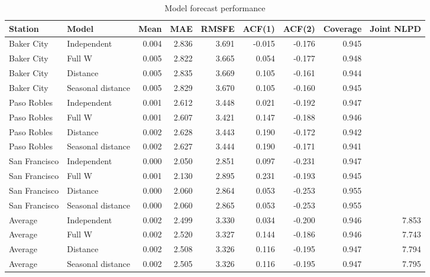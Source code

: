 \documentclass[
  10pt,
]{article}
\begin{document}
\begin{table}

\caption{\label{tab:tbl_perf_indiv}Model forecast performance\label{tbl:perf_indiv}}
\centering
\begin{tabular}[t]{llrrrrrrr}
\toprule
Station & Model & Mean & MAE & RMSFE & ACF(1) & ACF(2) & Coverage & Joint NLPD\\
\midrule
Baker City & Independent & 0.004 & 2.836 & 3.691 & -0.015 & -0.176 & 0.945 & \\
Baker City & Full W & 0.005 & 2.822 & 3.665 & 0.054 & -0.177 & 0.948 & \\
Baker City & Distance & 0.005 & 2.835 & 3.669 & 0.105 & -0.161 & 0.944 & \\
Baker City & Seasonal distance & 0.005 & 2.829 & 3.670 & 0.105 & -0.160 & 0.945 & \\
\addlinespace
Paso Robles & Independent & 0.001 & 2.612 & 3.448 & 0.021 & -0.192 & 0.947 & \\
Paso Robles & Full W & 0.001 & 2.607 & 3.421 & 0.147 & -0.188 & 0.946 & \\
Paso Robles & Distance & 0.002 & 2.628 & 3.443 & 0.190 & -0.172 & 0.942 & \\
Paso Robles & Seasonal distance & 0.002 & 2.627 & 3.444 & 0.190 & -0.171 & 0.941 & \\
\addlinespace
San Francisco & Independent & 0.000 & 2.050 & 2.851 & 0.097 & -0.231 & 0.947 & \\
San Francisco & Full W & 0.001 & 2.130 & 2.895 & 0.231 & -0.193 & 0.945 & \\
San Francisco & Distance & 0.000 & 2.060 & 2.864 & 0.053 & -0.253 & 0.955 & \\
San Francisco & Seasonal distance & 0.000 & 2.060 & 2.865 & 0.053 & -0.253 & 0.955 & \\
\addlinespace
Average & Independent & 0.002 & 2.499 & 3.330 & 0.034 & -0.200 & 0.946 & 7.853\\
Average & Full W & 0.002 & 2.520 & 3.327 & 0.144 & -0.186 & 0.946 & 7.743\\
Average & Distance & 0.002 & 2.508 & 3.326 & 0.116 & -0.195 & 0.947 & 7.794\\
Average & Seasonal distance & 0.002 & 2.505 & 3.326 & 0.116 & -0.195 & 0.947 & 7.795\\
\bottomrule
\end{tabular}
\end{table}
\end{document}
